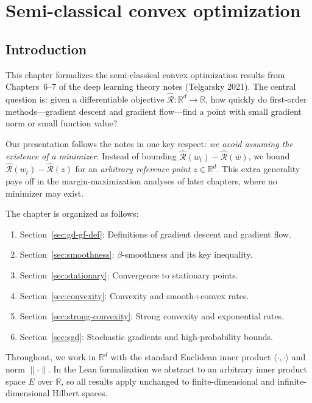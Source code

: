 \chapter{Semi-classical convex optimization}
\label{chap:optimization}

\section{Introduction}

This chapter formalizes the semi-classical convex optimization results from Chapters~6--7 of the deep learning theory notes (Telgarsky 2021).
The central question is: given a differentiable objective $\widehat{\mathcal{R}} : \mathbb{R}^d \to \mathbb{R}$, how quickly do first-order methods---gradient descent and gradient flow---find a point with small gradient norm or small function value?

Our presentation follows the notes in one key respect: \emph{we avoid assuming the existence of a minimizer}.
Instead of bounding $\widehat{\mathcal{R}}(w_t) - \widehat{\mathcal{R}}(\bar{w})$, we bound $\widehat{\mathcal{R}}(w_t) - \widehat{\mathcal{R}}(z)$ for an \emph{arbitrary reference point} $z \in \mathbb{R}^d$.
This extra generality pays off in the margin-maximization analyses of later chapters, where no minimizer may exist.

The chapter is organized as follows:
\begin{enumerate}
  \item Section~\ref{sec:gd-gf-def}: Definitions of gradient descent and gradient flow.
  \item Section~\ref{sec:smoothness}: $\beta$-smoothness and its key inequality.
  \item Section~\ref{sec:stationary}: Convergence to stationary points.
  \item Section~\ref{sec:convexity}: Convexity and smooth+convex rates.
  \item Section~\ref{sec:strong-convexity}: Strong convexity and exponential rates.
  \item Section~\ref{sec:sgd}: Stochastic gradients and high-probability bounds.
\end{enumerate}

Throughout, we work in $\mathbb{R}^d$ with the standard Euclidean inner product $\langle \cdot, \cdot \rangle$ and norm $\|\cdot\|$.
In the Lean formalization we abstract to an arbitrary inner product space $E$ over $\mathbb{R}$, so all results apply unchanged to finite-dimensional and infinite-dimensional Hilbert spaces.

